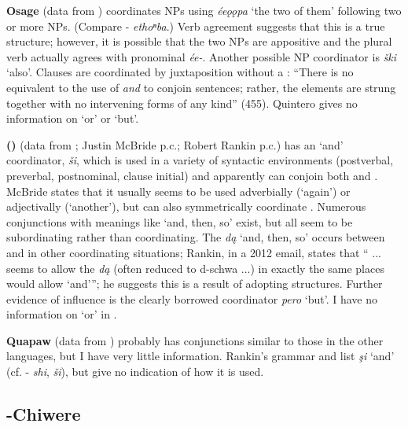 \documentclass[output=paper]{LSP/langsci}
\begin{document}
\textbf{Osage} (data from \citealt{Quintero2004}) coordinates NPs using \textit{ée\k{o}\k{o}pa} `the two of them' following two or more NPs. (Compare - \textit{ethoⁿba}.) Verb agreement suggests that this is a true  structure; however, it is possible that the two NPs are appositive and the plural verb actually agrees with pronominal \textit{ée-}. Another possible NP coordinator is \textit{\v{s}ki} `also'. Clauses are coordinated by juxtaposition without a : ``There is no  equivalent to the  use of \textit{and} to conjoin sentences; rather, the elements are strung together with no intervening forms of any kind'' (455). Quintero gives no information on `or' or `but'.

\textbf{ ()} (data from   \citealt{CumberlandRankin2012}; Justin McBride p.c.; Robert Rankin p.c.) has an `and' coordinator, \textit{\v{s}i}, which is used in a variety of syntactic environments (postverbal, preverbal, postnominal, clause initial) and apparently can conjoin both  and . McBride states that it usually seems to be used adverbially (`again') or adjectivally (`another'), but can also symmetrically coordinate . Numerous conjunctions with meanings like `and, then, so' exist, but all seem to be subordinating rather than coordinating. The  \textit{d\k{a}} `and, then, so' occurs between  and in other coordinating situations; Rankin, in a 2012 email, states that `` ... seems to allow the  \textit{d\k{a}} (often reduced to d-schwa ...) in exactly the same places  would allow `and'''; he suggests this is a result of adopting   structures. Further evidence of  influence is the clearly borrowed coordinator \textit{pero} `but'. I have no information on `or' in .

\textbf{Quapaw} (data from \citealt{Rankin2002,Rankin2005b}) probably has conjunctions similar to those in the other  languages, but I have very little information. Rankin's grammar and  list \textit{\c{s}i} `and' (cf. - \textit{shi},  \textit{\v{s}i}), but give no indication of how it is used.

\subsection{-Chiwere}
 
\end{document}
